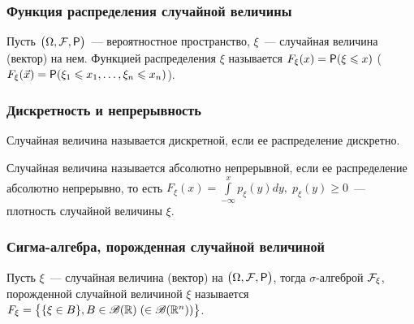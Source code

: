 \subsubsection*{ Функция распределения случайной величины}
\begin{definition}
	Пусть $\big(\Omega, \F, \P\big)$~--- вероятностное пространство, $\xi$~--- случайная величина (вектор) на нем. Функцией распределения $\xi$ называется $F_\xi(x) = \P(\xi \leqslant x)$ ($F_\xi(\vec x) = \P(\xi_1 \leqslant x_1, \ldots, \xi_n \leqslant x_n)$).
\end{definition}
\subsubsection*{ Дискретность и непрерывность}
\begin{definition}
	Случайная величина называется дискретной, если ее распределение дискретно.
\end{definition}
\begin{definition}
	Случайная величина называется абсолютно непрерывной, если ее распределение абсолютно непрерывно, то есть $F_\xi(x) = \int\limits_{-\infty}^xp_\xi(y)dy,\; p_\xi(y) \geqslant 0$~--- плотность случайной величины $\xi$.
\end{definition}
\subsubsection*{ Сигма-алгебра, порожденная случайной величиной}
\begin{definition}
	Пусть $\xi$~--- случайная величина (вектор) на $\big(\Omega, \F, \P\big)$, тогда $\sigma$-алгеброй $\F_\xi$, порожденной случайной величиной $\xi$ называется $F_\xi = \big\{\{\xi \in B\}, B \in \B(\R)\; (\in \B(\R^n)) \big\}$.
\end{definition}